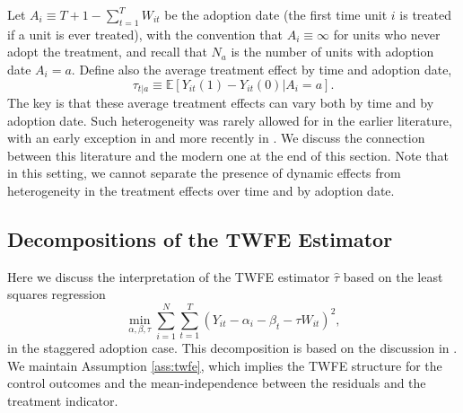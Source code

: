 \documentclass[letterpaper,12pt,leqno]{article}
\newcommand{\mme}{{\mathbb{E}}}
\begin{document}
Let $A_i\equiv T+1-\sum_{t=1}^T W_{it}$ be the adoption date (the first time unit $i$ is treated if a unit is ever treated), with the convention that $A_i\equiv \infty$ for units who never adopt the treatment, and recall that $N_a$ is the number of units with adoption date $A_i=a$.
Define also the average treatment effect by time and adoption date,
\[ \tau_{t|a}\equiv \mme\left[ \left.Y_{it}(1)-Y_{it}(0)\right|A_i=a\right].\]
The key is that these average treatment effects can vary both by time and by adoption date.
Such heterogeneity was rarely allowed for in the earlier literature, with an early exception in \citep{chamberlain1992efficiency} and more recently in \citep{arellano2011identifying,graham2012identification,chernozhukov2013average}. We discuss the connection between this literature and the modern one at the end of this section. 
Note that in this setting, we cannot separate the presence of dynamic effects from heterogeneity in the treatment effects over time and by adoption date.



\subsection{Decompositions of the TWFE Estimator}

Here we discuss the interpretation of the TWFE estimator $\hat\tau$ based on the least squares regression
\[ \min_{\alpha,\beta,\tau}\sum_{i=1}^N \sum_{t=1}^T \left(Y_{it}-\alpha_i-\beta_t-\tau W_{it}\right)^2,\]
in the staggered adoption case. This decomposition is based on 
the discussion in  \citep{goodman2021difference}. We maintain Assumption \ref{ass:twfe}, which implies the TWFE structure for the control outcomes and the mean-independence between the residuals and the treatment indicator.
\end{document}
